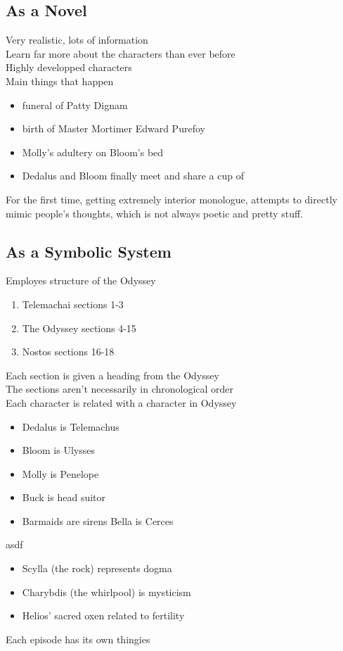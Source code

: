 \documentclass[12pt]{article}
\begin{document}
		\subsection{As a Novel}
			Very realistic, lots of information \\
			Learn far more about the characters than ever before \\
			Highly developped characters \\
			Main things that happen
				\begin{itemize}
					\item funeral of Patty Dignam
					\item birth of Master Mortimer Edward Purefoy
					\item Molly's adultery on Bloom's bed
					\item Dedalus and Bloom finally meet and share a
					cup of
				\end{itemize}
			For the first time, getting extremely interior monologue,
			attempts to directly mimic people's thoughts, which is not
			always poetic and pretty stuff.
		
		\subsection{As a Symbolic System}
			Employes structure of the Odyssey
				\begin{enumerate}
					\item Telemachai sections 1-3
					\item The Odyssey sections 4-15
					\item Nostos sections 16-18
				\end{enumerate}
			Each section is given a heading from the Odyssey \\
			The sections aren't necessarily in chronological order\\
			Each character is related with a character in Odyssey
				\begin{itemize}
					\item Dedalus is Telemachus
					\item Bloom is Ulysses
					\item Molly is Penelope
					\item Buck is head suitor
					\item Barmaids are sirens
					\itme Bella is Cerces
				\end{itemize}
			asdf
				\begin{itemize}
					\item Scylla (the rock) represents dogma
					\item Charybdis (the whirlpool) is
					mysticism
					\item Helios' sacred oxen related to
					fertility
				\end{itemize}
			Each episode has its own thingies
\end{document}
